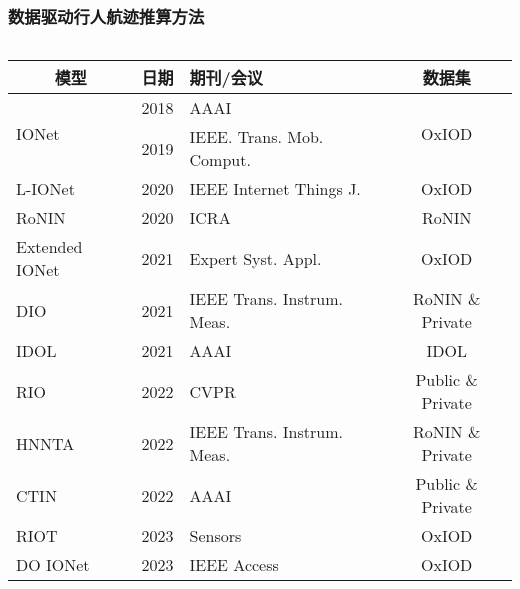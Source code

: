 \begin{frame}
	\frametitle{数据驱动行人航迹推算方法}
	\begin{columns}[t]
		\begin{column}{0.5\textwidth}
		{
		    \tiny
		    \setlength{\tabcolsep}{2pt}
			\begin{tabular*}{\textwidth}{@{\extracolsep{\fill}}lclc}
				\toprule
				\multicolumn{1}{c}{模型} & 日期 & 期刊/会议 & 数据集 \\
				\midrule
				\multirow{2}{*}{IONet} & 2018 & AAAI                            & \multirow{2}{*}{OxIOD} \\ %
				                       & 2019 & IEEE. Trans. Mob. Comput.       &                        \\ %
				               L-IONet & 2020 & IEEE Internet Things J.         & OxIOD                  \\ %
				                 RoNIN & 2020 & ICRA                            & RoNIN                  \\ %
				        Extended IONet & 2021 & Expert Syst. Appl.              & OxIOD                   \\ 
				                   DIO & 2021 & IEEE Trans. Instrum. Meas.      & RoNIN \& Private       \\ %
				                  IDOL & 2021 & AAAI                            & IDOL                   \\ %
				                   RIO & 2022 & CVPR                            & Public \& Private      \\ %
				                 HNNTA & 2022 & IEEE Trans. Instrum. Meas.      & RoNIN \& Private       \\ %
				                  CTIN & 2022 & AAAI                            & Public \& Private      \\ %
				                  RIOT & 2023 & Sensors                         & OxIOD                  \\
				              DO IONet & 2023 & IEEE Access                     & OxIOD                  \\

\end{tabular*}}
\end{column}
\end{columns}
\end{frame}
